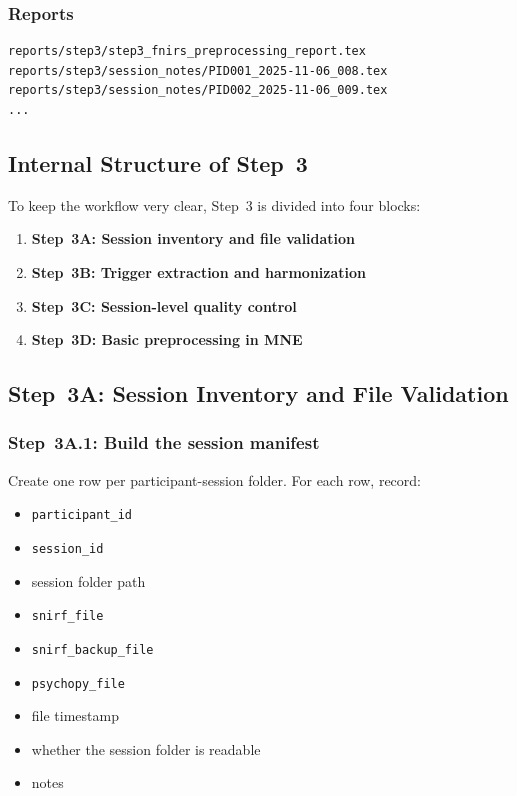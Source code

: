 \subsubsection*{Reports}
\begin{verbatim}
reports/step3/step3_fnirs_preprocessing_report.tex
reports/step3/session_notes/PID001_2025-11-06_008.tex
reports/step3/session_notes/PID002_2025-11-06_009.tex
...
\end{verbatim}

\subsection{Internal Structure of Step~3}
To keep the workflow very clear, Step~3 is divided into four blocks:
\begin{enumerate}
    \item \textbf{Step~3A: Session inventory and file validation}
    \item \textbf{Step~3B: Trigger extraction and harmonization}
    \item \textbf{Step~3C: Session-level quality control}
    \item \textbf{Step~3D: Basic preprocessing in MNE}
\end{enumerate}

\subsection{Step~3A: Session Inventory and File Validation}

\subsubsection{Step~3A.1: Build the session manifest}
Create one row per participant-session folder.
For each row, record:
\begin{itemize}
    \item \texttt{participant\_id}
    \item \texttt{session\_id}
    \item session folder path
    \item \texttt{snirf\_file}
    \item \texttt{snirf\_backup\_file}
    \item \texttt{psychopy\_file}
    \item file timestamp
    \item whether the session folder is readable
    \item notes
\end{itemize}

